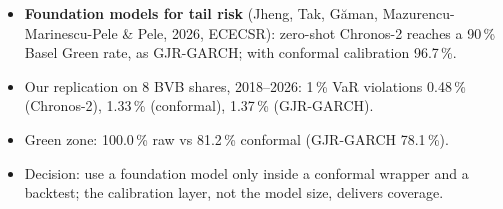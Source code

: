 \begin{itemize}\setlength{\itemsep}{2pt}
  \item \textbf{Foundation models for tail risk} (Jheng, Tak, Găman, Mazurencu-Marinescu-Pele \& Pele, 2026, ECECSR): zero-shot Chronos-2 reaches a 90\,\% Basel Green rate, as GJR-GARCH; with conformal calibration 96.7\,\%.
  \item Our replication on 8 BVB shares, 2018--2026: 1\,\% VaR violations 0.48\,\% (Chronos-2), 1.33\,\% (conformal), 1.37\,\% (GJR-GARCH).
  \item Green zone: 100.0\,\% raw vs 81.2\,\% conformal (GJR-GARCH 78.1\,\%).
  \item Decision: use a foundation model only inside a conformal wrapper and a backtest; the calibration layer, not the model size, delivers coverage.
\end{itemize}
